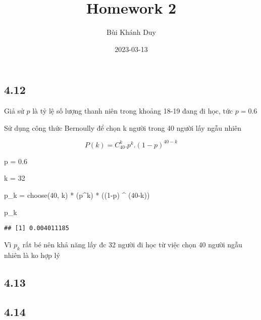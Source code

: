 \documentclass[
]{article}
\title{Homework 2}
\author{Bùi Khánh Duy}
\date{2023-03-13}
\newenvironment{Shaded}{\begin{snugshade}}{\end{snugshade}}
\newcommand{\DecValTok}[1]{\textcolor[rgb]{0.00,0.00,0.81}{#1}}
\newcommand{\FloatTok}[1]{\textcolor[rgb]{0.00,0.00,0.81}{#1}}
\newcommand{\FunctionTok}[1]{\textcolor[rgb]{0.00,0.00,0.00}{#1}}
\newcommand{\NormalTok}[1]{#1}
\newcommand{\OtherTok}[1]{\textcolor[rgb]{0.56,0.35,0.01}{#1}}
\newcommand{\SpecialCharTok}[1]{\textcolor[rgb]{0.00,0.00,0.00}{#1}}
\begin{document}
\maketitle

\hypertarget{section}{%
\subsection{4.12}\label{section}}

Giả sử \(p\) là tỷ lệ số lượng thanh niên trong khoảng 18-19 đang đi
học, tức \(p=0.6\)

Sử dụng công thức Bernoully để chọn k người trong 40 người lấy ngẫu
nhiên

\[
P(k) = C^k_{40}.p^k.(1-p)^{40-k}
\]

\begin{Shaded}
\begin{Highlighting}[]
\NormalTok{p }\OtherTok{=} \FloatTok{0.6}

\NormalTok{k }\OtherTok{=} \DecValTok{32}

\NormalTok{p\_k }\OtherTok{=} \FunctionTok{choose}\NormalTok{(}\DecValTok{40}\NormalTok{, k) }\SpecialCharTok{*}\NormalTok{ (p}\SpecialCharTok{\^{}}\NormalTok{k) }\SpecialCharTok{*}\NormalTok{ ((}\DecValTok{1}\SpecialCharTok{{-}}\NormalTok{p) }\SpecialCharTok{\^{}}\NormalTok{ (}\DecValTok{40}\SpecialCharTok{{-}}\NormalTok{k))}

\NormalTok{p\_k}
\end{Highlighting}
\end{Shaded}

\begin{verbatim}
## [1] 0.004011185
\end{verbatim}

Vì \(p_k\) rất bé nên khả năng lấy đc 32 người đi học từ việc chọn 40
người ngẫu nhiên là ko hợp lý

\hypertarget{section-1}{%
\subsection{4.13}\label{section-1}}

\hypertarget{section-2}{%
\subsection{4.14}\label{section-2}}
\end{document}
